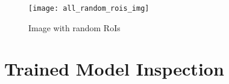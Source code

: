 \begin{figure}[h!]
  \centering
  \texttt{[image: all\_random\_rois\_img]}
  \caption[Image with random RoIs]
   {Image with random RoIs}
   \label{fig:randomrois}
\end{figure}

\newpage
\section{Trained Model Inspection}
\label{sec:trainedmodel}







































